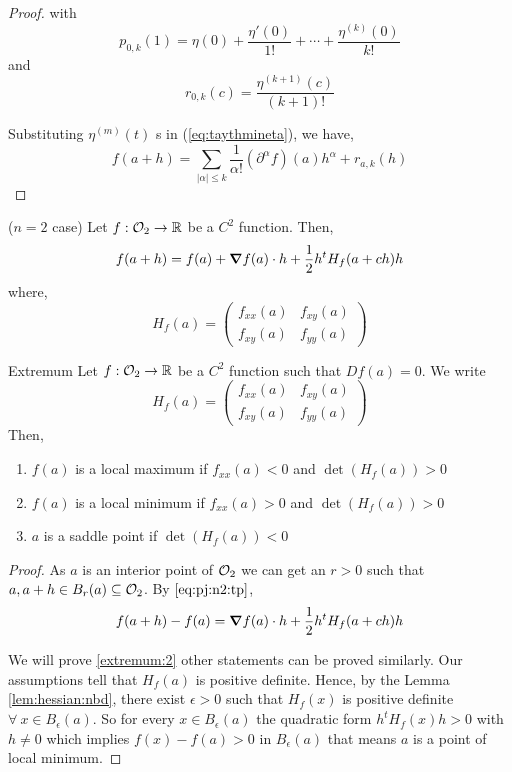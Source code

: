 \documentclass[../Analysis-3.tex]{subfiles}
\begin{document}
\begin{proof}
  with \begin{equation}
    p_{0,k}(1) = \eta(0) + \frac{\eta '(0)}{1!} + \cdots + \frac{\eta^{(k)}(0)}{k!}
  \end{equation} and
  \begin{equation}
    r_{0,k} (c) = \frac{\eta^{(k+1)}(c)}{(k+1)!}
  \end{equation}

  Substituting $\eta^{(m)}(t)$ s in (\ref{eq:taythmineta}), we have,
  \[ f(a+h) = \sum_{| \alpha | \leq k } \frac{1}{\alpha !} ({\partial}^{\alpha} f ) (a) h^{\alpha} + r_{a,k} (h) \]
\end{proof}

\begin{noteBox}
  ($n=2$ case) Let $f : \mathcal{O}_{2} \to \mathbb{R}$ be a $C^2$ function. Then,
  \begin{equation}\label{eq:pj:n2:tp}
    f(a+h) = f(a) + \grad f(a)\cdot h + \frac{1}{2}h^t H_f(a+ch)h
  \end{equation} where,
  \[ H_f(a) = \begin{pmatrix}
      f_{xx}(a) & f_{xy}(a) \\
      f_{xy}(a) & f_{yy}(a)
    \end{pmatrix} \]
\end{noteBox}

\begin{Thm}{Extremum}{}
  Let $f : \mathcal{O}_{2} \to \mathbb{R}$ be a $C^2$ function such that $Df(a) = 0$. We write \[ H_f(a) =  \begin{pmatrix}
      f_{xx}(a) & f_{xy}(a) \\
      f_{xy}(a) & f_{yy}(a)
    \end{pmatrix} \]
  Then, \begin{enumerate}[label=(\roman*)]
    \item $f(a)$ is a local maximum if $f_{xx} (a) < 0$ and $\det (H_f(a)) > 0$
    \item $f(a)$ is a local minimum if $f_{xx} (a) > 0$ and $\det (H_f(a)) > 0$ \label{extremum:2}
    \item $a$ is a saddle point if $\det (H_f(a)) < 0$
  \end{enumerate}
\end{Thm}

\begin{proof}
  As $ a $ is an interior point of $ \mathcal{O}_{2} $ we can get an $ r > 0 $ such that $ a, a+h \in B_r(a) \subseteq \mathcal{O}_{2}$. By $\eqref{eq:pj:n2:tp}$, \[ f(a+h) - f(a) = \grad f(a) \cdot h + \frac{1}{2}h^t H_f(a+ch)h \]

  We will prove \ref{extremum:2} other statements can be proved similarly. Our assumptions tell that $H_f(a)$ is positive definite. Hence, by the Lemma \ref{lem:hessian:nbd}, there exist $ \epsilon > 0 $ such that $H_f(x)$ is positive definite $\forall\ x \in B_{\epsilon}(a)$. So for every $ x \in B_{\epsilon}(a) $ the quadratic form $ h^t H_f(x) h > 0 $ with $ h \neq 0 $ which implies $ f(x) - f(a) > 0 $ in $ B_{\epsilon}(a) $ that means $a$ is a point of local minimum.
\end{proof}
\end{document}
